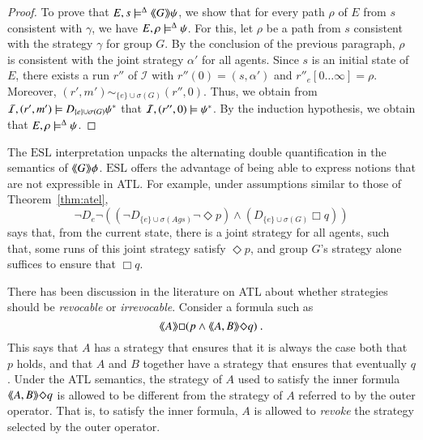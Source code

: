 \documentclass[a4wide]{article}
\newcommand{\ESL}{\mbox{ESL}}
\theoremstyle{examplesty}
\newcommand{\strat}{\sigma}
\newcommand{\Ags}{\mathit{Ags}}
\newcommand{\I}{\mathcal{I}}
\newcommand{\atlop}[1]{\langle\hspace{-2pt}\langle #1 \rangle \hspace{-2pt}\rangle }
\newcommand{\Env}{E}
\newcommand{\always}{\Box}
\newcommand{\sometimes}{\Diamond}
\newcommand{\sgy}{\alpha}
\begin{document}
\begin{proof}
To prove that $\Env, s \models^\GStrats \atlop{G} \psi$, we show that 
for every path $\rho$ of $\Env$ from $s$ consistent with 
$\gamma$, 
we have $\Env, \rho   \models^\GStrats   \psi$. 
For this, let $\rho$ be a path from $s$ consistent with the strategy 
$\gamma$ 
for group $G$.
By the conclusion of the previous paragraph, $\rho$ is consistent with the joint strategy $\sgy'$ for all agents. 
Since $s$ is an initial state of $\Env$, there exists a run $r''$ of 
$\I$ with $r''(0) = (s, \sgy')$ and $r''_e[0\ldots \infty] = \rho$. 
Moreover, $(r',m') \sim_{\{e\} \cup \strat(G)} (r'',0)$.
Thus, we obtain from $\I, (r',m')\models  D_{\{e\} \cup \strat(G)}  \trl{\psi}$
that $\I, (r'',0)\models  \trl{\psi}$. 
By the induction hypothesis, 
we obtain that \mbox{$\Env, \rho \models^\GStrats \psi$}. 
\end{proof} 


The $\ESL$ interpretation unpacks the alternating double quantification in the semantics of $\atlop{G}\phi$. 
$\ESL$ offers the advantage of being able to express notions that are not expressible in 
ATL. For example,
under assumptions similar to those of Theorem~\ref{thm:atel}, 
$$ \neg D_{e} \neg (( \neg D_{\{e\} \cup \strat(\Ags)} \neg \sometimes p) \land (D_{\{e\} \cup \strat(G)} \always q)) $$ 
says that, from the current state, there is a joint strategy for all agents, such that,
some runs of this joint strategy  satisfy $\sometimes p$, and group $G$'s strategy alone suffices to ensure that 
$\always q$. 



There has been discussion in the literature on ATL about whether strategies should be
\emph{revocable} or \emph{irrevocable}. Consider a formula such as 
$$ \atlop{A} \always ( p \land \atlop{A,B} \sometimes q)~.$$ 
This says that $A$ has a strategy that ensures that it is always the case both that $p$ holds, 
and that $A$ and $B$ together have a strategy that ensures that eventually $q$. 
Under the ATL semantics, the strategy of $A$ used to satisfy the inner 
formula  $\atlop{A,B} \sometimes q$ is allowed to be different from the strategy 
of $A$ 
referred
to by the outer operator. That is, to satisfy the inner formula, $A$ is allowed
to \emph{revoke} the strategy selected by the outer operator. 
\end{document}
